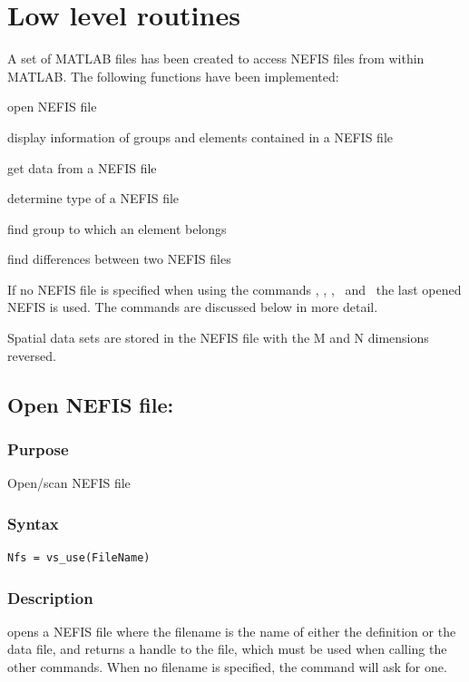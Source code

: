 
\chapter{Low level routines} \label{Chp:LowLevelRoutines}
A set of MATLAB files has been created to access NEFIS files from within MATLAB.
The following functions have been implemented:

\begin{guilist}
\item[\vsuse] open NEFIS file
\item[\vsdisp]display information of groups and elements contained in a NEFIS file
\item[\vslet/\vsget] get data from a NEFIS file
\item[\vstype] determine type of a NEFIS file
\item[\vsfind] find group to which an element belongs
\item[\vsdiff] find differences between two NEFIS files
\end{guilist}

If no NEFIS file is specified when using the commands \vsdisp, \vslet, \vsget, \vstype~and \vsfind~the last opened NEFIS is used.
The commands are discussed below in more detail.

\begin{Remark}
\item Spatial data sets are stored in the NEFIS file with the M and N dimensions reversed.
\end{Remark}

\section{Open NEFIS file: \vsuse}

\subsection*{Purpose}
Open/scan NEFIS file

\subsection*{Syntax}
\begin{Verbatim}
Nfs = vs_use(FileName)
\end{Verbatim}

\subsection*{Description}
 opens a NEFIS file where the filename is the name of either the definition or the data file, and returns a handle  to the file, which must be used when calling the other commands.
When no filename is specified, the command will ask for one.

